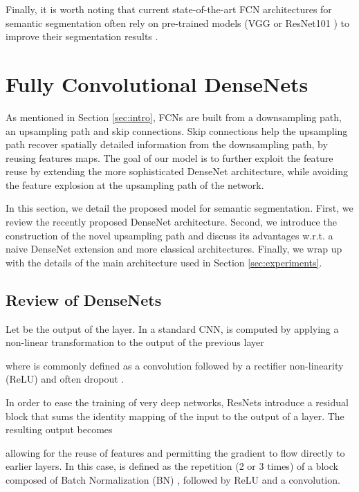 \documentclass[10pt,twocolumn,letterpaper]{article}
\begin{document}
Finally, it is worth noting that current state-of-the-art FCN architectures for semantic segmentation often rely on pre-trained models (\eg VGG \cite{SimonyanZ14a} or ResNet101 \cite{HeZRS15}) to improve their segmentation results \cite{long2015fully, SegNet2015, ChenPK0Y16}.


\section{Fully Convolutional DenseNets}
\label{sec:dense_nets}
As mentioned in Section \ref{sec:intro}, FCNs are built from a downsampling path, an upsampling path and skip connections. Skip connections help the upsampling path recover spatially detailed information from the downsampling path, by reusing features maps. The goal of our model is to further exploit the feature reuse by extending the more sophisticated DenseNet architecture, while avoiding the feature explosion at the upsampling path of the network.

In this section, we detail the proposed model for semantic segmentation. First, we review the recently proposed DenseNet architecture. Second, we introduce the construction of the novel upsampling path and discuss its advantages w.r.t. a naive DenseNet extension and more classical architectures. Finally, we wrap up with the details of the main architecture used in Section \ref{sec:experiments}.

\subsection{Review of DenseNets}
\label{ssec:densenetreview}

Let  be the output of the  layer. In a standard CNN,  is computed by applying a non-linear transformation  to the output of the previous layer 

where  is commonly defined as a convolution followed by a rectifier non-linearity (ReLU) and often dropout  \cite{srivastava14a}.

In order to ease the training of very deep networks, ResNets \cite{HeZRS15} introduce a residual block that sums the identity mapping of the input to the output of a layer. The resulting output  becomes

allowing for the reuse of features and permitting the gradient to flow directly to earlier layers. In this case,  is defined as the repetition (2 or 3 times) of a block composed of Batch Normalization (BN) \cite{IoffeS15}, followed by ReLU and a convolution. 
\end{document}
